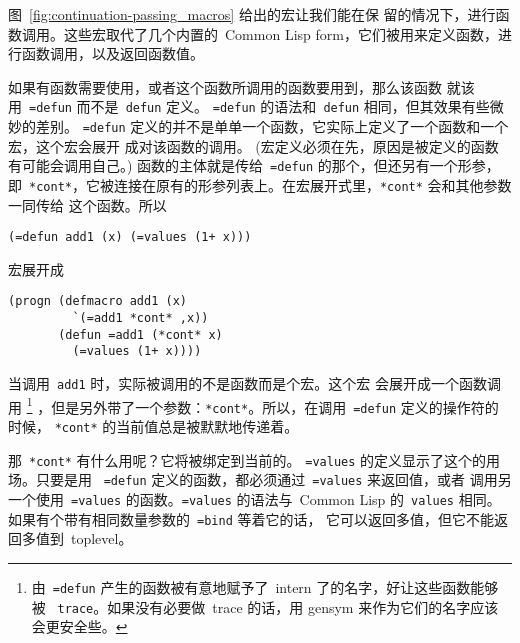图~\ref{fig:continuation-passing_macros} 给出的宏让我们能在保
留\continuation{}的情况下，进行函数调用。这些宏取代了几个内置的~Common
Lisp form，它们被用来定义函数，进行函数调用，以及返回函数值。

如果有函数需要使用\continuation{}，或者这个函数所调用的函数要用到\continuation{}，那么该函数
就该用~\texttt{=defun} 而不是~\texttt{defun} 定义。
\texttt{=defun} 的语法和~\texttt{defun} 相同，但其效果有些微妙的差别。
\texttt{=defun} 定义的并不是单单一个函数，它实际上定义了一个函数和一个宏，这个宏会展开
成对该函数的调用。
(宏定义必须在先，原因是被定义的函数有可能会调用自己。)
函数的主体就是传给~\texttt{=defun} 的那个，但还另有一个形参，
即~\verb|*cont*|，它被连接在原有的形参列表上。在宏展开式里，\texttt{*cont*} 会和其他参数一同传给
这个函数。所以
\begin{lstlisting}
(=defun add1 (x) (=values (1+ x)))
\end{lstlisting}
宏展开成
\begin{lstlisting}
(progn (defmacro add1 (x)
         `(=add1 *cont* ,x))
       (defun =add1 (*cont* x)
         (=values (1+ x))))
\end{lstlisting}

当调用~\texttt{add1} 时，实际被调用的不是函数而是个宏。这个宏
会展开成一个函数调用%
\footnote{由~\texttt{=defun} 产生的函数被有意地赋予了~intern 了的名字，好让这些函数能够被~
  \texttt{trace}。如果没有必要做~trace 的话，用 gensym 来作为它们的名字应该会更安全些。}\label{trace}%
，但是另外带了一个参数：\texttt{*cont*}。所以，在调用~\texttt{=defun} 定义的操作符的时候，
\texttt{*cont*} 的当前值总是被默默地传递着。

那~\texttt{*cont*} 有什么用呢？它将被绑定到当前的\continuation{}。
\texttt{=values} 的定义显示了这个\continuation{}的用场。只要是用
~\texttt{=defun} 定义的函数，都必须通过~\texttt{=values} 来返回值，或者
调用另一个使用~\verb|=values| 的函数。\texttt{=values} 的语法与~Common Lisp
的~\texttt{values} 相同。如果有个带有相同数量参数的~\texttt{=bind}\label{page:bind} 等着它的话，
它可以返回多值，但它不能返回多值到~toplevel。

